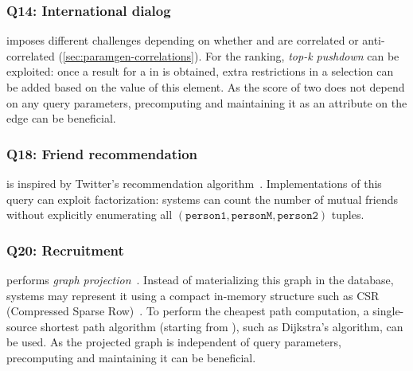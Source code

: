 \subsubsection{Q14: International dialog}

 imposes different challenges depending on whether
\tCountries {} and  are correlated or anti-correlated
(\autoref{sec:paramgen-correlations}).
For the ranking, \emph{top-k pushdown} can be exploited:
once a result for a \tCity in  is obtained,
extra restrictions in a selection can be added based on the value of this element.
As the score of two \tPersons does not depend on any query parameters,
precomputing and maintaining it as an attribute on the \tKnows edge can be beneficial.

\subsubsection{Q18: Friend recommendation}

 is inspired by Twitter's recommendation algorithm~\cite{DBLP:conf/www/GuptaGLSWZ13}.
Implementations of this query can exploit factorization:
systems can count the number of mutual friends without explicitly enumerating all
$(\texttt{person1}, \texttt{personM}, \texttt{person2})$ tuples.

\subsubsection{Q20: Recruitment}

 performs \emph{graph projection}~\cite{DBLP:conf/sigmod/AnglesABBFGLPPS18}.
Instead of materializing this graph in the database,
systems may represent it using a compact in-memory structure such as CSR (Compressed Sparse Row)~\cite{DBLP:books/daglib/0009092}.
To perform the cheapest path computation, a single-source shortest path algorithm
(starting from ), such as Dijkstra's algorithm, can be used.
As the projected graph %
is independent of query parameters, precomputing and maintaining it can be beneficial.



